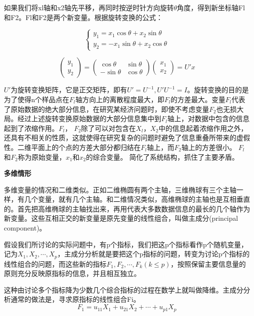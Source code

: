 \documentclass[]{ctexbook}
\begin{document}
如果我们将xl轴和x2轴先平移，再同时按逆时针方向旋转\(\theta\)角度，得到新坐标轴Fl和F2。Fl和F2是两个新变量。根据旋转变换的公式：

\[\begin{cases} y_1=x_1\cos\theta+x_2\sin\theta \\ y_2=-x_1\sin\theta+x_2\cos\theta \end{cases}\]

\[\begin{pmatrix} y_1 \\ y_2 \end{pmatrix}=\begin{pmatrix} \cos\theta & \sin\theta \\ -\sin\theta & \cos\theta \end{pmatrix} \begin{pmatrix} x_1 \\ x_2 \end{pmatrix}=U'x\]

\(U'\)为旋转变换矩阵，它是正交矩阵，即有\(U'=U^{-1},U'U^{-1}=I\)。旋转变换的目的是为了使得n个样品点在\(F_l\)轴方向上的离散程度最大，即\(F_l\)的方差最大。变量\(F_l\)代表了原始数据的绝大部分信息，在研究某经济问题时，即使不考虑变量\(F_2\)也无损大局。经过上述旋转变换原始数据的大部分信息集中到\(F_l\)轴上，对数据中包含的信息起到了浓缩作用。\(F_l\)， \(F_2\)除了可以对包含在\(X_l\)，\(X_2\)中的信息起着浓缩作用之外，还具有不相关的性质，这就使得在研究复杂的问题时避免了信息重叠所带来的虚假性。二维平面上的个点的方差大部分都归结在\(F_l\)轴上，而\(F_2\)轴上的方差很小。 \(F_l\)和\(F_2\)称为原始变量，\(x_1\)和\(x_2\)的综合变量。 简化了系统结构，抓住了主要矛盾。

\textbf{多维情形}

多维变量的情况和二维类似。正如二维椭圆有两个主轴，三维椭球有三个主轴一样，有几个变量，就有几个主轴。和二维情况类似，高维椭球的主轴也是互相垂直的。首先把高维椭球的主轴找出来，再用代表大多数数据信息的最长的几个轴作为新变量。这些互相正交的新变量是原先变量的线性组合，叫做主成分(principal component)。

假设我们所讨论的实际问题中，有p个指标，我们把这p个指标看作p个随机变量，记为\(X_1,X_2,\cdots,X_p\)，主成分分析就是要把这个p指标的问题，转变为讨论p个指标的线性组合的问题，而这些新的指标\(F_1,F_2,\cdots,F_k(k\le p)\)，按照保留主要信息量的原则充分反映原指标的信息，并且相互独立。

这种由讨论多个指标降为少数几个综合指标的过程在数学上就叫做降维。主成分分析通常的做法是，寻求原指标的线性组合Fi。
\[F_1=u_{11}X_1+u_{21}X_2+\cdots+u_{p1}X_p\]
\end{document}
